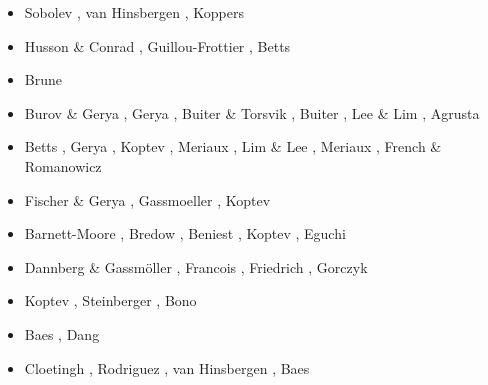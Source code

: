 \begin{scriptsize}
\begin{itemize}
\item[\twothousandeleven] Sobolev \etal \cite{sosk11}, van Hinsbergen \etal \cite{vasd11},
                          Koppers \cite{kopp11}
\item[\twothousandtwelve] Husson \& Conrad \cite{huco12}, Guillou-Frottier \etal \cite{gubc12},
                          Betts \etal \cite{bemm12}
\item[\twothousandthirteen] Brune \etal \cite{brps13}
\item[\twothousandfourteen] Burov \& Gerya \cite{buge14}, Gerya \cite{gery14b},
                            Buiter \& Torsvik \cite{buto14}, Buiter \cite{buit14},
                            Lee \& Lim \cite{leli14}, Agrusta \etal \cite{agat13}
\item[\twothousandfifteen] Betts \etal \cite{bemm15}, Gerya \etal \cite{gesb15},
                           Koptev \etal \cite{kocb15}, Meriaux \etal \cite{meds15},
                           Lim \& Lee \cite{lile15}, Meriaux \etal \cite{medd15},
                           French \& Romanowicz \cite{frro15}
\item[\twothousandsixteen] Fischer \& Gerya \cite{fige16}, Gassmoeller \etal \cite{gadb16},
                           Koptev \etal \cite{kobc16}
\item[\twothousandseventeen] Barnett-Moore \etal \cite{bahf17}, Bredow \etal \cite{brsg17},
                             Beniest \etal \cite{bekb17}, Koptev \etal \cite{kocb17},
                             Eguchi \etal \cite{egim17}
\item[\twothousandeighteen] Dannberg \& Gassm\"oller \cite{daga18}, Francois \etal \cite{frkc18},
                            Friedrich \etal \cite{frbr18}, Gorczyk \etal \cite{gomb18}
\item[\twothousandnineteen] Koptev \etal \cite{kobg19}, Steinberger \etal \cite{stbl19},
                            Bono \etal \cite{botb19}
\item[\twothousandtwenty] Baes \etal \cite{basg20,basg20b}, Dang \etal \cite{dazl20}
\item[\twothousandtwentyone] Cloetingh \etal \cite{clkk21}, Rodriguez \etal \cite{roac21},
                             van Hinsbergen \etal \cite{vasg21}, Baes \etal \cite{basg21}
\end{itemize}
\end{scriptsize}

